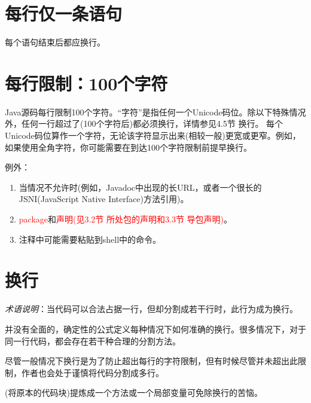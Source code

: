 \documentclass[cn,11pt,chinese]{elegantbook}
\begin{document}
\section{每行仅一条语句}
每个语句结束后都应换行。

\section{每行限制：100个字符}
Java源码每行限制100个字符。``字符''是指任何一个Unicode码位。除以下特殊情况外，任何一行超过了(100个字符后)都必须换行，详情参见4.5节 换行。 每个Unicode码位算作一个字符，无论该字符显示出来(相较一般)更宽或更窄。例如，如果使用全角字符，你可能需要在到达100个字符限制前提早换行。

例外：
\begin{enumerate}
	\item 当情况不允许时(例如，Javadoc中出现的长URL，或者一个很长的JSNI(JavaScript Native Interface)方法引用)。
	\item \textcolor{red}{package}和\textcolor{red}{声明(见3.2节 所处包的声明和3.3节 导包声明)}。
	\item 注释中可能需要粘贴到shell中的命令。
\end{enumerate}

\section{换行}
\emph{术语说明}：当代码可以合法占据一行，但却分割成若干行时，此行为成为换行。

并没有全面的，确定性的公式定义每种情况下如何准确的换行。很多情况下，对于同一行代码，都会存在若干种合理的分割方法。

\begin{note}
	尽管一般情况下换行是为了防止超出每行的字符限制，但有时候尽管并未超出此限制，作者也会处于谨慎将代码分割成多行。
\end{note}

\begin{remark}
	(将原本的代码块)提炼成一个方法或一个局部变量可免除换行的苦恼。
\end{remark}
\end{document}
